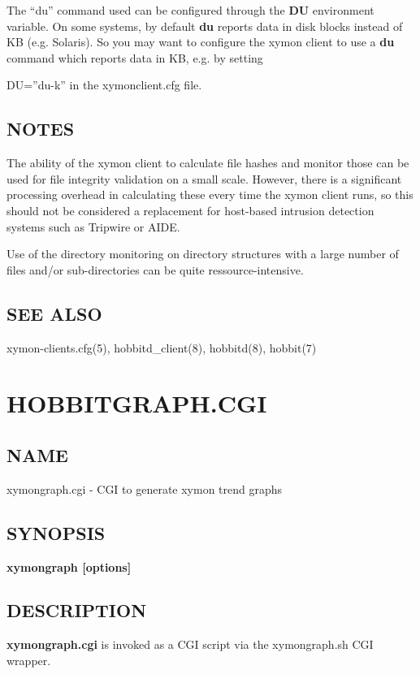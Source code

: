   The ``du'' command used can be configured through the \textbf{DU}
 environment variable. On some systems, by default \textbf{du}
 reports data in disk blocks instead of KB (e.g. Solaris). So you may want to configure the xymon client to use a \textbf{du}
 command which reports data in KB, e.g. by setting  
 
DU=''du-k''  
 in the xymonclient.cfg file. 


 
\subsection{NOTES}
 The ability of the xymon client to calculate file hashes and monitor
 those can be used for file integrity validation on a small
 scale. However, there is a significant processing overhead in
 calculating these every time the xymon client runs, so this should
 not be considered a replacement for host-based intrusion detection
 systems such as Tripwire or AIDE. 


  Use of the directory monitoring on directory structures with a large number of files and/or sub-directories can be quite ressource-intensive. 


 
\subsection{SEE ALSO}
xymon-clients.cfg(5), hobbitd\_client(8), hobbitd(8), hobbit(7) 

 

%
\newpage
\section{HOBBITGRAPH.CGI}
\subsection{NAME}
 xymongraph.cgi - CGI to generate xymon trend graphs 
\subsection{SYNOPSIS}
\textbf{xymongraph [options]}


 
\subsection{DESCRIPTION}
\textbf{xymongraph.cgi}
 is invoked as a CGI script via the xymongraph.sh CGI wrapper. 

